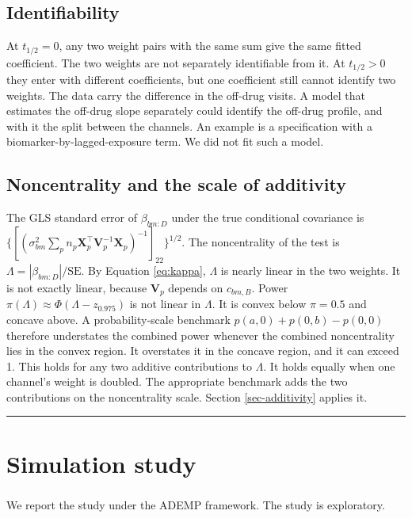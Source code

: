 \documentclass[
  11pt,
]{article}
\begin{document}
\subsection{Identifiability}\label{identifiability}

At \(t_{1/2} = 0\), any two weight pairs with the same sum give the same
fitted coefficient. The two weights are not separately identifiable
from it. At \(t_{1/2} > 0\) they enter with different coefficients, but
one coefficient still cannot identify two weights. The data carry the
difference in the off-drug visits. A model that estimates the off-drug
slope separately could identify the off-drug profile, and with it the
split between the channels. An example is a specification with a
biomarker-by-lagged-exposure term. We did not fit such a model.

\subsection{Noncentrality and the scale of additivity}\label{noncentrality-and-the-scale-of-additivity}

The GLS standard error of \(\beta_{bm:D}\) under the true conditional
covariance is
\(\{[(\sigma_{bm}^2 \sum_p n_p \mathbf{X}_p^\top \mathbf{V}_p^{-1}
\mathbf{X}_p)^{-1}]_{22}\}^{1/2}\). The noncentrality of the test is
\(\Lambda = |\beta_{bm:D}| / \mathrm{SE}\). By Equation
\eqref{eq:kappa}, \(\Lambda\) is nearly linear in the two weights. It is
not exactly linear, because \(\mathbf{V}_p\) depends on \(c_{bm,B}\).
Power \(\pi(\Lambda) \approx \Phi(\Lambda - z_{0.975})\) is not linear
in \(\Lambda\). It is convex below \(\pi = 0.5\) and concave above. A
probability-scale benchmark \(p(a, 0) + p(0, b) - p(0, 0)\) therefore
understates the combined power whenever the combined noncentrality
lies in the convex region. It overstates it in the concave region,
and it can exceed 1. This holds for any two additive contributions to
\(\Lambda\). It holds equally when one channel's weight is doubled. The
appropriate benchmark adds the two contributions on the
noncentrality scale. Section \ref{sec-additivity} applies it.

\bigskip\noindent

\rule{\textwidth}{0.4pt}\bigskip

\section{Simulation study}\label{sec-sim}

We report the study under the ADEMP framework\textsuperscript{}. The study is exploratory.
\end{document}
